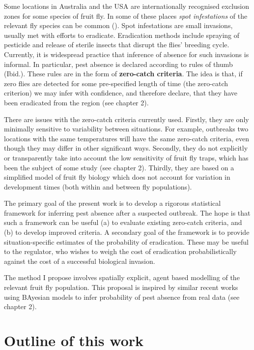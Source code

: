 \documentclass[
  oneside]{book}
\begin{document}
Some locations in Australia and the USA are internationally recognised exclusion zones for some species of fruit fly. In some of these places \emph{spot infestations} of the relevant fly species can be common (\citet{meats2005}). Spot infestations are small invasions, usually met with efforts to eradicate. Eradication methods include spraying of pesticide and release of sterile insects that disrupt the flies' breeding cycle. Currently, it is widespread practice that inference of absence for such invasions is informal. In particular, pest absence is declared according to rules of thumb (Ibid.). These rules are in the form of \textbf{zero-catch criteria}. The idea is that, if zero flies are detected for some pre-specified length of time (the zero-catch criterion) we may infer with confidence, and therefore declare, that they have been eradicated from the region (see chapter 2).

There are issues with the zero-catch criteria currently used. Firstly, they are only minimally sensitive to variability between situations. For example, outbreaks two locations with the same temperatures will have the same zero-catch criteria, even though they may differ in other significant ways. Secondly, they do not explicitly or transparently take into account the low sensitivity of fruit fly traps, which has been the subject of some study (see chapter 2). Thirdly, they are based on a simplified model of fruit fly biology which does not account for variation in development times (both within and between fly populations).

The primary goal of the present work is to develop a rigorous statistical framework for inferring pest absence after a suspected outbreak. The hope is that such a framework can be useful (a) to evaluate existing zero-catch criteria, and (b) to develop improved criteria. A secondary goal of the framework is to provide situation-specific estimates of the probability of eradication. These may be useful to the regulator, who wishes to weigh the cost of eradication probabilistically against the cost of a successful biological invasion.

The method I propose involves spatially explicit, agent based modelling of the relevant fruit fly population. This proposal is inspired by similar recent works using BAyesian models to infer probability of pest absence from real data (see chapter 2).

\hypertarget{outline-of-this-work}{%
\section{Outline of this work}\label{outline-of-this-work}}
\end{document}

